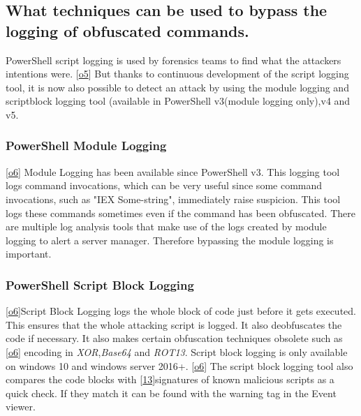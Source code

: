 \documentclass{article}%
\begin{document}
\subsection{What techniques can be used to bypass the logging of obfuscated commands.}
PowerShell script logging is used by forensics teams to find what the attackers intentions were. [\hyperlink{o5}{o5}] But thanks to continuous development of the script logging tool, it is now also possible to detect an attack by using the module logging and scriptblock logging tool (available in PowerShell v3(module logging only),v4 and  v5.
\subsubsection{PowerShell Module Logging}
[\hyperlink{o6}{o6}] Module Logging has been available since PowerShell v3. This logging tool logs command invocations, which can be very useful since some command invocations, such as "IEX Some-string", immediately raise suspicion. This tool logs these commands sometimes even if the command has been obfuscated. There are multiple log analysis tools that make use of the logs created by module logging to alert a server manager. Therefore bypassing the module logging is important.
\subsubsection{PowerShell Script Block Logging}
[\hyperlink{o6}{o6}]Script Block Logging logs the whole block of code just before it gets executed. This ensures that the whole attacking script is logged. It also deobfuscates the code if necessary. It also makes certain obfuscation techniques obsolete such as [\hyperlink{o6}{o6}] encoding in \textit{XOR},\textit{Base64} and \textit{ROT13}. Script block logging is only available on windows 10 and windows server 2016+. [\hyperlink{o6}{o6}] The script block logging tool also compares the code blocks with [\hyperlink{13}{13}]signatures of known malicious scripts as a quick check. If they match it can be found with the warning tag in the Event viewer.
\end{document}
